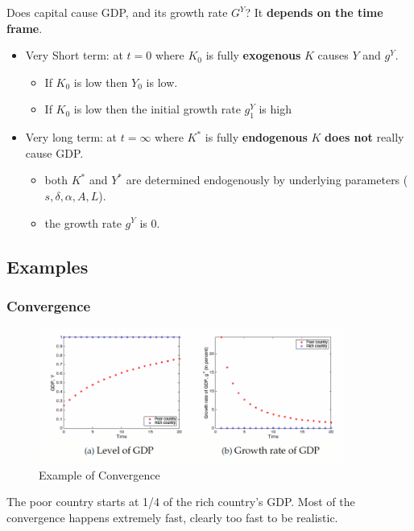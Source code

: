 \documentclass[11pt]{article}
\begin{document}
Does capital cause GDP, and its growth rate $G^Y$? It \textbf{depends on the time frame}. 
\begin{itemize}
    \item Very Short term: at $t=0$ where $K_0$ is fully \textbf{exogenous} $K$ causes $Y$ and $g^Y$.
    \begin{itemize}
        \item If $K_0$ is low then $Y_0$ is low.
        \item If $K_0$ is low then the initial growth rate $g_1^Y$ is high
    \end{itemize}
    \item Very long term: at $t=\infty$ where $K^*$ is fully \textbf{endogenous} $K$ \textbf{does not} really cause GDP. 
    \begin{itemize}
        \item both $K^*$ and $Y^*$ are determined endogenously by underlying parameters ($s, \delta, \alpha, A, L$).
        \item the growth rate $g^Y$ is 0.
    \end{itemize}
\end{itemize}



\subsection{Examples}

\subsubsection{Convergence}

\begin{figure}[h]
    \centering
    \includegraphics[width=10cm]{photos/example convergence solow .png}
    \caption{Example of Convergence}
    \label{fig:Solow Convergence}
\end{figure}
\begin{note}
    The poor country starts at 1/4 of the rich country's GDP. Most of the convergence happens extremely fast, clearly too fast to be realistic.
\end{note}
\end{document}
